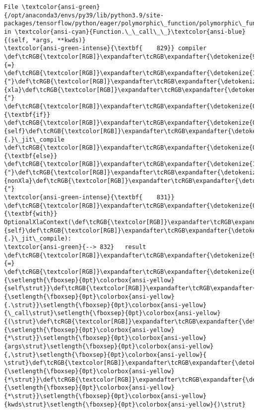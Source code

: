 \documentclass[11pt]{article}
\begin{document}
\begin{Verbatim}[commandchars=\\\{\}, frame=single, framerule=2mm, rulecolor=\color{outerrorbackground}]
File \textcolor{ansi-green}{/opt/anaconda3/envs/py39/lib/python3.9/site-packages/tensorflow/python/eager/polymorphic\_function/polymorphic\_function.py:832}, in \textcolor{ansi-cyan}{Function.\_\_call\_\_}\textcolor{ansi-blue}{(self, *args, **kwds)}
\textcolor{ansi-green-intense}{\textbf{    829}} compiler \def\tcRGB{\textcolor[RGB]}\expandafter\tcRGB\expandafter{\detokenize{98,98,98}}{=} \def\tcRGB{\textcolor[RGB]}\expandafter\tcRGB\expandafter{\detokenize{175,0,0}}{"}\def\tcRGB{\textcolor[RGB]}\expandafter\tcRGB\expandafter{\detokenize{175,0,0}}{xla}\def\tcRGB{\textcolor[RGB]}\expandafter\tcRGB\expandafter{\detokenize{175,0,0}}{"} \def\tcRGB{\textcolor[RGB]}\expandafter\tcRGB\expandafter{\detokenize{0,135,0}}{\textbf{if}} \def\tcRGB{\textcolor[RGB]}\expandafter\tcRGB\expandafter{\detokenize{0,135,0}}{self}\def\tcRGB{\textcolor[RGB]}\expandafter\tcRGB\expandafter{\detokenize{98,98,98}}{.}\_jit\_compile \def\tcRGB{\textcolor[RGB]}\expandafter\tcRGB\expandafter{\detokenize{0,135,0}}{\textbf{else}} \def\tcRGB{\textcolor[RGB]}\expandafter\tcRGB\expandafter{\detokenize{175,0,0}}{"}\def\tcRGB{\textcolor[RGB]}\expandafter\tcRGB\expandafter{\detokenize{175,0,0}}{nonXla}\def\tcRGB{\textcolor[RGB]}\expandafter\tcRGB\expandafter{\detokenize{175,0,0}}{"}
\textcolor{ansi-green-intense}{\textbf{    831}} \def\tcRGB{\textcolor[RGB]}\expandafter\tcRGB\expandafter{\detokenize{0,135,0}}{\textbf{with}} OptionalXlaContext(\def\tcRGB{\textcolor[RGB]}\expandafter\tcRGB\expandafter{\detokenize{0,135,0}}{self}\def\tcRGB{\textcolor[RGB]}\expandafter\tcRGB\expandafter{\detokenize{98,98,98}}{.}\_jit\_compile):
\textcolor{ansi-green}{--> 832}   result \def\tcRGB{\textcolor[RGB]}\expandafter\tcRGB\expandafter{\detokenize{98,98,98}}{=} \def\tcRGB{\textcolor[RGB]}\expandafter\tcRGB\expandafter{\detokenize{0,135,0}}{\setlength{\fboxsep}{0pt}\colorbox{ansi-yellow}{self\strut}}\def\tcRGB{\textcolor[RGB]}\expandafter\tcRGB\expandafter{\detokenize{98,98,98}}{\setlength{\fboxsep}{0pt}\colorbox{ansi-yellow}{.\strut}}\setlength{\fboxsep}{0pt}\colorbox{ansi-yellow}{\_call\strut}\setlength{\fboxsep}{0pt}\colorbox{ansi-yellow}{(\strut}\def\tcRGB{\textcolor[RGB]}\expandafter\tcRGB\expandafter{\detokenize{98,98,98}}{\setlength{\fboxsep}{0pt}\colorbox{ansi-yellow}{*\strut}}\setlength{\fboxsep}{0pt}\colorbox{ansi-yellow}{args\strut}\setlength{\fboxsep}{0pt}\colorbox{ansi-yellow}{,\strut}\setlength{\fboxsep}{0pt}\colorbox{ansi-yellow}{ \strut}\def\tcRGB{\textcolor[RGB]}\expandafter\tcRGB\expandafter{\detokenize{98,98,98}}{\setlength{\fboxsep}{0pt}\colorbox{ansi-yellow}{*\strut}}\def\tcRGB{\textcolor[RGB]}\expandafter\tcRGB\expandafter{\detokenize{98,98,98}}{\setlength{\fboxsep}{0pt}\colorbox{ansi-yellow}{*\strut}}\setlength{\fboxsep}{0pt}\colorbox{ansi-yellow}{kwds\strut}\setlength{\fboxsep}{0pt}\colorbox{ansi-yellow}{)\strut}

\end{Verbatim}
\end{document}
